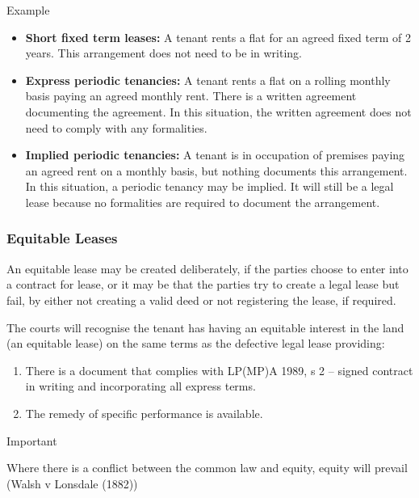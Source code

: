 \documentclass[
]{article}
\providecommand{\tightlist}{%
  \setlength{\itemsep}{0pt}\setlength{\parskip}{0pt}}
\newenvironment{env-4361be9f-9a08-465c-86d1-6b024e2d00e2}
{
    \savenotes\tcolorbox[blanker,breakable,left=5pt,borderline west={2pt}{-4pt}{cyan}]
}
{
    \endtcolorbox\spewnotes
}
\newenvironment{env-8fa37bb4-768d-4893-9e93-b3dc64db7fb6}
{
    \savenotes\tcolorbox[blanker,breakable,left=5pt,borderline west={2pt}{-4pt}{purple}]
}
{
    \endtcolorbox\spewnotes
}
\begin{document}
\begin{env-8fa37bb4-768d-4893-9e93-b3dc64db7fb6}

Example

\begin{itemize}
\tightlist
\item
  \textbf{Short fixed term leases:} A tenant rents a flat for an agreed
  fixed term of 2 years. This arrangement does not need to be in
  writing.
\item
  \textbf{Express periodic tenancies:} A tenant rents a flat on a
  rolling monthly basis paying an agreed monthly rent. There is a
  written agreement documenting the agreement. In this situation, the
  written agreement does not need to comply with any formalities.
\item
  \textbf{Implied periodic tenancies:} A tenant is in occupation of
  premises paying an agreed rent on a monthly basis, but nothing
  documents this arrangement. In this situation, a periodic tenancy may
  be implied. It will still be a legal lease because no formalities are
  required to document the arrangement.
\end{itemize}

\end{env-8fa37bb4-768d-4893-9e93-b3dc64db7fb6}

\hypertarget{equitable-leases}{%
\subsubsection{Equitable Leases}\label{equitable-leases}}

An equitable lease may be created deliberately, if the parties choose to
enter into a contract for lease, or it may be that the parties try to
create a legal lease but fail, by either not creating a valid deed or
not registering the lease, if required.

The courts will recognise the tenant has having an equitable interest in
the land (an equitable lease) on the same terms as the defective legal
lease providing:

\begin{enumerate}
\tightlist
\item
  There is a document that complies with LP(MP)A 1989, s 2 -- signed
  contract in writing and incorporating all express terms.
\item
  The remedy of specific performance is available.
\end{enumerate}

\begin{env-4361be9f-9a08-465c-86d1-6b024e2d00e2}

Important

Where there is a conflict between the common law and equity, equity will
prevail (Walsh v Lonsdale (1882))

\end{env-4361be9f-9a08-465c-86d1-6b024e2d00e2}
\end{document}
